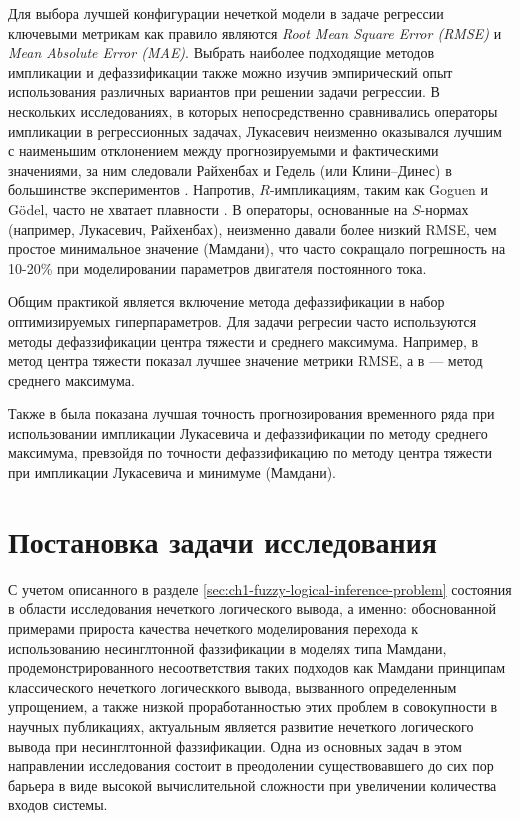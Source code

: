 Для выбора лучшей конфигурации нечеткой модели в задаче регрессии ключевыми метрикам как правило являются \textit{Root Mean Square Error (RMSE)} и \textit{Mean Absolute Error (MAE)}. Выбрать наиболее подходящие методов импликации и дефаззификации также можно изучив эмпирический опыт использования различных вариантов при решении задачи регрессии. В нескольких исследованиях, в которых непосредственно сравнивались операторы импликации в регрессионных задачах, Лукасевич неизменно оказывался лучшим с наименьшим отклонением между прогнозируемыми и фактическими значениями, за ним следовали Райхенбах и Гедель (или Клини–Динес) в большинстве экспериментов \cite{Gkountakou2023}. Напротив, $R$-импликациям, таким как Goguen и Gödel, часто не хватает плавности \cite{Krieken2022}. В \cite{Kiszka1985} операторы, основанные на $S$-нормах (например, Лукасевич, Райхенбах), неизменно давали более низкий RMSE, чем простое минимальное значение (Мамдани), что часто сокращало погрешность на 10-20\% при моделировании параметров двигателя постоянного тока.

Общим практикой является включение метода дефаззификации в набор оптимизируемых гиперпараметров. Для задачи регресии часто используются методы дефаззификации центра тяжести и среднего максимума. Например, в \cite{Ali2022} метод центра тяжести показал лучшее значение метрики RMSE, а в \cite{Yan2010} --- метод среднего максимума.

Также в \cite{Bede2018} была показана лучшая точность прогнозирования временного ряда при использовании импликации Лукасевича и дефаззификации по методу среднего максимума, превзойдя по точности дефаззификацию по методу центра тяжести при импликации Лукасевича и минимуме (Мамдани).

\section{Постановка задачи исследования}

С учетом описанного в разделе \cref{sec:ch1-fuzzy-logical-inference-problem} состояния в области исследования нечеткого логического вывода, а именно: обоснованной примерами прироста качества нечеткого моделирования перехода к использованию несинглтонной фаззификации в моделях типа Мамдани, продемонстрированного несоответствия таких подходов как Мамдани принципам классического нечеткого логическкого вывода, вызванного определенным упрощением, а также низкой проработанностью этих проблем в совокупности в научных публикациях, актуальным является развитие нечеткого логического вывода при несинглтонной фаззификации. Одна из основных задач в этом направлении исследования состоит в преодолении существовавшего до сих пор барьера в виде высокой вычислительной сложности при увеличении количества входов системы.

